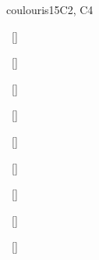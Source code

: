 \begin{syllabus}
\begin{unit}{\PDDistributedSystems}{}{coulouris}{15}{C2, C4}
\begin{topics}%
    \item \PDDistributedSystemsTopicFaults
    \item \PDDistributedSystemsTopicDistributed
    \item \PDDistributedSystemsTopicDistributedSystem
    \item \PDDistributedSystemsTopicDistributedService
    \item \PDDistributedSystemsTopicCore
\end{topics}
\begin{learningoutcomes}%
    \item \PDDistributedSystemsLODistinguishNetwork~[\Familiarity] %
    \item \PDDistributedSystemsLOExplainWhySuch~[\Familiarity] %
    \item \PDDistributedSystemsLOWriteAPerforms~[\Usage] %
    \item \PDDistributedSystemsLOMeasure~[\Usage] %
    \item \PDDistributedSystemsLOExplainWhySystem~[\Familiarity] %
    \item \PDDistributedSystemsLOImplementAForSpell~[\Usage] %
    \item \PDDistributedSystemsLOExplainTheOverhead~[\Familiarity] %
    \item \PDDistributedSystemsLODescribeTheAssociated~[\Familiarity] %
    \item \PDDistributedSystemsLOGiveExamplesFor~[\Usage] %
\end{learningoutcomes}%
\end{unit}


\end{syllabus}
